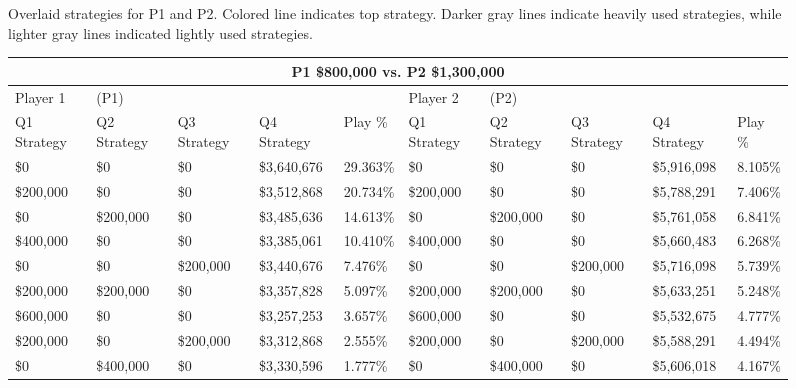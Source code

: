 \documentclass[11pt]{article}
\begin{document}
\begin{figure}
{
}
\caption{Overlaid strategies for P1 and P2. Colored line indicates top strategy. Darker gray lines indicate heavily used strategies, while lighter gray lines indicated lightly used strategies.}
\label{8v12.1}
\end{figure}

\begin{figure}
\tiny
\begin{tabular}{ |p{1.0cm}p{1.0cm}p{1.0cm}p{2.0cm}|p{1.0cm}||p{1.0cm}p{1.0cm}p{1.0cm}p{2.0cm}|p{1.0cm}|}
\hline
\multicolumn{10}{|c|}{P1 \$800,000 vs. P2 \$1,300,000} \\
\hline
Player 1 & (P1) & & & & Player 2 & (P2) & & & \\
\hline
Q1 Strategy & Q2 Strategy & Q3 Strategy & Q4 Strategy  &  Play \% & Q1 Strategy & Q2 Strategy & Q3 Strategy & Q4 Strategy  &  Play \%\\
\hline
\$0 & \$0 & \$0 & \$3,640,676 & 29.363\%            & \$0 & \$0 & \$0 & \$5,916,098 & 8.105\% \\
\$200,000 & \$0 & \$0 & \$3,512,868 & 20.734\%      & \$200,000 & \$0 & \$0 & \$5,788,291 & 7.406\% \\
\$0 & \$200,000 & \$0 & \$3,485,636 & 14.613\%      & \$0 & \$200,000 & \$0 & \$5,761,058 & 6.841\% \\
\$400,000 & \$0 & \$0 & \$3,385,061 & 10.410\%      & \$400,000 & \$0 & \$0 & \$5,660,483 & 6.268\% \\
\$0 & \$0 & \$200,000 & \$3,440,676 & 7.476\%       & \$0 & \$0 & \$200,000 & \$5,716,098 & 5.739\% \\
\$200,000 & \$200,000 & \$0 & \$3,357,828 & 5.097\% & \$200,000 & \$200,000 & \$0 & \$5,633,251 & 5.248\% \\
\$600,000 & \$0 & \$0 & \$3,257,253 & 3.657\%       & \$600,000 & \$0 & \$0 & \$5,532,675 & 4.777\% \\
\$200,000 & \$0 & \$200,000 & \$3,312,868 & 2.555\% & \$200,000 & \$0 & \$200,000 & \$5,588,291 & 4.494\% \\
\$0 & \$400,000 & \$0 & \$3,330,596 & 1.777\%       & \$0 & \$400,000 & \$0 & \$5,606,018 & 4.167\% \\

\end{tabular}
\end{figure}
\end{document}
